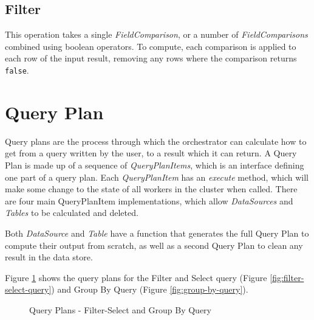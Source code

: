 \subsection{Filter}
This operation takes a single \textit{FieldComparison}, or a number of \textit{FieldComparisons} combined using boolean operators. To compute, each comparison is applied to each row of the input result, removing any rows where the comparison returns \texttt{false}.



\section{Query Plan}
Query plans are the process through which the orchestrator can calculate how to get from a query written by the user, to a result which it can return. A Query Plan is made up of a sequence of \textit{QueryPlanItems}, which is an interface defining one part of a query plan. Each \textit{QueryPlanItem} has an \textit{execute} method, which will make some change to the state of all workers in the cluster when called. There are four main QueryPlanItem implementations, which allow \textit{DataSources} and \textit{Tables} to be calculated and deleted.

Both \textit{DataSource} and \textit{Table} have a function that generates the full Query Plan to compute their output from scratch, as well as a second Query Plan to clean any result in the data store. 

Figure \ref{fig:filter-group-by-query-plan} shows the query plans for the Filter and Select query (Figure \ref{fig:filter-select-query}) and Group By Query (Figure \ref{fig:group-by-query}).

\begin{figure}
	\centering
	\qquad
	\caption{Query Plans - Filter-Select and Group By Query}%
	\label{fig:filter-group-by-query-plan}
\end{figure}


